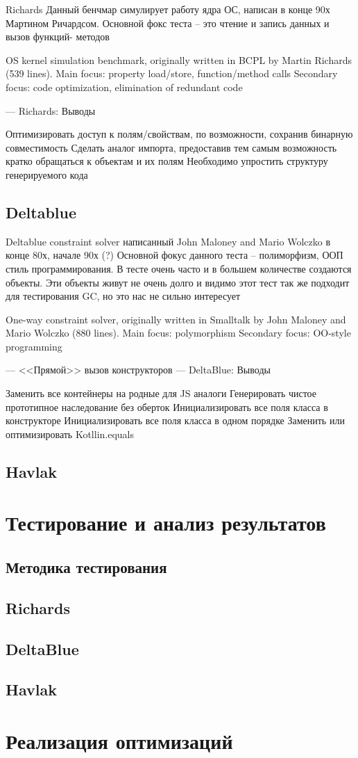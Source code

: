 Richards
Данный бенчмар симулирует работу ядра ОС, написан в конце 90х Мартином Ричардсом.
Основной фокс теста -- это чтение и запись данных и вызов функций- методов

OS kernel simulation benchmark, originally written in BCPL by Martin Richards (539 lines).
Main focus: property load/store, function/method calls
Secondary focus: code optimization, elimination of redundant code

---
Richards: Выводы

Оптимизировать доступ к полям/свойствам, по возможности, сохранив бинарную совместимость
Сделать аналог импорта, предоставив тем самым возможность кратко обращаться к объектам и их полям
Необходимо упростить структуру генерируемого кода

\subsection{Deltablue}

Deltablue
constraint solver написанный John Maloney and Mario Wolczko в конце 80х, начале 90х (?)
Основной фокус данного теста -- полиморфизм, ООП стиль программирования. В тесте очень часто и в большем количестве создаются объекты. Эти объекты живут не очень долго и видимо этот тест так же подходит для тестирования GC, но это нас не сильно интересует

One-way constraint solver, originally written in Smalltalk by John Maloney and Mario Wolczko (880 lines).
Main focus: polymorphism
Secondary focus: OO-style programming

---
<<Прямой>> вызов конструкторов
---
DeltaBlue: Выводы

Заменить все контейнеры на родные для JS аналоги
Генерировать чистое прототипное наследование без оберток
Инициализировать все поля класса в конструкторе
Инициализировать все поля класса в одном порядке
Заменить или оптимизировать Kotllin.equals

\subsection{Havlak}

\section{Тестирование и анализ результатов}
\subsection{Методика тестирования}
\subsection{Richards}
\subsection{DeltaBlue}
\subsection{Havlak}
\section {Реализация оптимизаций}